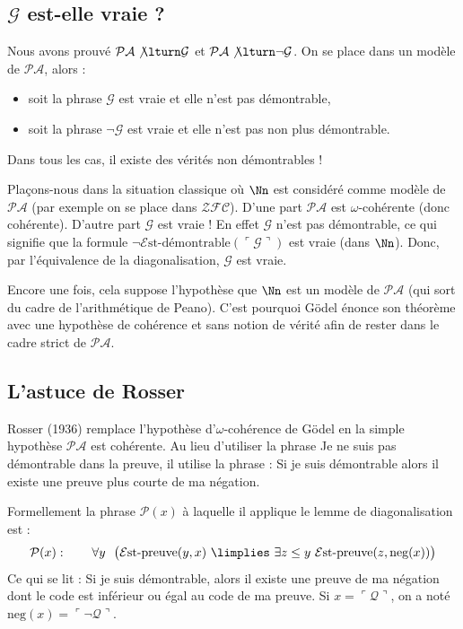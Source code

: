\documentclass[11pt,class=report,crop=false]{standalone}
\begin{document}
\subsection{$\mathcal{G}$ est-elle vraie ?}

Nous avons prouvé $\mathcal{PA} \not\lturn \mathcal{G}$ et $\mathcal{PA} \not\lturn \lnot \mathcal{G}$. On se place dans un modèle de $\mathcal{PA}$, alors :
\begin{itemize}
    \item soit la phrase $\mathcal{G}$ est vraie et elle n'est pas démontrable,
    \item soit la phrase $\lnot \mathcal{G}$ est vraie et elle n'est pas non plus démontrable.
\end{itemize}
Dans tous les cas, il existe des vérités non démontrables !

\medskip

Plaçons-nous dans la situation classique où $\Nn$ est considéré comme modèle de $\mathcal{PA}$ (par exemple on se place dans $\mathcal{ZFC}$). D'une part $\mathcal{PA}$ est $\omega$-cohérente (donc cohérente). D'autre part $\mathcal{G}$ est vraie !
En effet $\mathcal{G}$ n'est pas démontrable, ce qui signifie que la formule $\lnot \mathcal{E}\text{st-démontrable}(\ulcorner \mathcal{G} \urcorner)$ est vraie (dans $\Nn$). Donc, par l'équivalence de la diagonalisation, $\mathcal{G}$ est vraie.

Encore une fois, cela suppose l'hypothèse que $\Nn$ est un modèle de $\mathcal{PA}$ (qui sort du cadre de l'arithmétique de Peano). C'est pourquoi Gödel énonce son théorème avec une hypothèse de cohérence et sans notion de vérité afin de rester dans le cadre strict de $\mathcal{PA}$.



\subsection{L'astuce de Rosser}

Rosser (1936) remplace l'hypothèse d'$\omega$-cohérence de Gödel en la simple hypothèse \og{}$\mathcal{PA}$ est cohérente\fg{}. Au lieu d'utiliser la phrase \og{}Je ne suis pas démontrable\fg{} dans la preuve, il utilise la phrase : \og{}Si je suis démontrable alors il existe une preuve plus courte de ma négation\fg{}. 

Formellement la phrase $\mathcal{P}(x)$ à laquelle il applique le lemme de diagonalisation est :
\[
\mathcal{P}(x) : \qquad  \forall y \ \ \big( \mathcal{E}\text{st-preuve}(y, x) \ \limplies \  \exists z \le y \ \mathcal{E}\text{st-preuve}(z, \text{neg}(x)) \big)
\]
Ce qui se lit : \og{}Si je suis démontrable, alors il existe une preuve de ma négation dont le code est inférieur ou égal au code de ma preuve.\fg{}
Si $x = \ulcorner \mathcal{Q} \urcorner$, on a noté $\text{neg}(x) = \ulcorner \lnot \mathcal{Q} \urcorner$.
\end{document}
